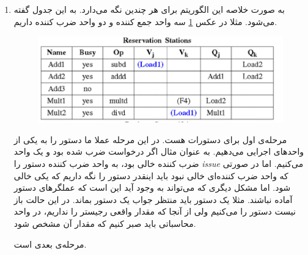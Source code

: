\section{}
\begin{enumerate}
    \item به صورت خلاصه این الگوریتم برای هر  چندین 
    نگه می‌دارد. به این جدول
    گفته می‌شود. مثلا در عکس
    \ref{pic:reservation_status}
    سه واحد جمع کننده و دو واحد ضرب کننده داریم.
    \begin{figure}[H]
        \centering
        \includegraphics[scale=0.5]{pics/5-reservation-status.png}
        \caption{}
        \label{pic:reservation_status}
    \end{figure}
    مرحله‌ی اول برای دستورات
    هست. در این مرحله عملا ما دستور را به یکی از واحد‌های اجرایی
    می‌دهیم. به عنوان مثال اگر درخواست ضرب شده بود و یک واحد ضرب کننده خالی بود، به واحد ضرب کننده
    دستور را
    \emph{issue}
    می‌کنیم. اما در صورتی که واحد ضرب کننده‌ای خالی نبود باید اینقدر دستور را نگه داریم که یکی
    خالی شود.
    اما مشکل دیگری که می‌تواند به وجود آید این است که عملگر‌های دستور آماده نباشند. مثلا یک دستور
    باید منتظر جواب یک دستور
    بماند. در این حالت باز نیست دستور را
    می‌کنیم ولی از آنجا که مقدار واقعی رجیستر را نداریم،‌ در واحد محاسباتی باید صبر کنیم که مقدار
    آن مشخص شود.

    مرحله‌ی بعدی
    است.
\end{enumerate}